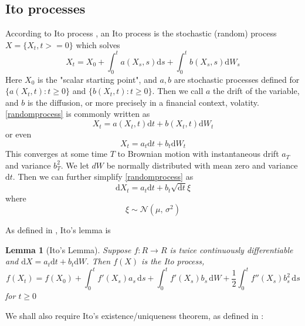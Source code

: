 \documentclass[11pt]{article} %
\newtheorem{lemma}[theorem]{Lemma}
\begin{document}
\subsection{Ito processes}

According to Ito process \cite{itoprocess}, an Ito process is the stochastic (random) 
process $X = \{X_t, t>=0\}$ which solves 
\begin{equation} \label{randomprocess}
X_t = X_0 + \int_{0}^{t} a(X_s, s)\mathrm{d}s + 
\int_{0}^{t} b(X_s, s) \mathrm{d}W_s
\end{equation}
Here $X_0$ is the "scalar starting point", and $a,b$ are stochastic 
processes defined for $\{a(X_t, t) : t\geq0\} $ and $\{b(X_t, t) : t\geq0\}$. 
Then we call $a$ the drift of the variable, and $b$ is the diffusion, 
or more precisely in a financial context, volatity. \ref{randomprocess} is commonly 
written as 
\begin{equation}
    X_t = a(X_t, t)\mathrm{d}t + b(X_t, t)\mathrm{d}W_t
\end{equation}
or even 
\begin{equation}
    X_t = a_t\mathrm{d}t + b_t\mathrm{d}W_t
\end{equation}
This converges at some time $T$ to Brownian motion with instantaneous drift $a_T$ and
variance $b_T^2$. We let $dW$ be normally distributed with mean zero and variance 
$\mathrm{d}t$. Then we can further simplify \ref{randomprocess} as 
\begin{equation}
    \mathrm{d}X_t = a_t\mathrm{d}t + b_t \sqrt{\mathrm{d}t}\xi
\end{equation}
where
\begin{equation}
    \xi \sim \mathcal{N}(\mu,\,\sigma^{2})
\end{equation}

As defined in \cite{itoprocess}, Ito's lemma is 

\begin{lemma}[Ito's Lemma] 
    \label{itolemma}
    Suppose $f: R \to R$ is twice continuously differentiable and 
    $\mathrm{d}X = a_t\mathrm{d}t + b_t\mathrm{d}W$. Then $f(X)$ is the Ito process,
    \begin{equation}
        f(X_t)
        = f(X_0) + \int_0^t \! f'(X_s)a_s \, \mathrm{d}s + 
        \int_0^t \! f'(X_s)b_s \, \mathrm{d}W + \frac{1}{2}\int_0^t \! f''(X_s)b_s^2 \,
         \mathrm{d}s
    \end{equation}
    for $t\ge0$
\end{lemma}
We shall also require Ito's existence/uniqueness theorem, as defined in 
\cite{SDE}:
\end{document}
